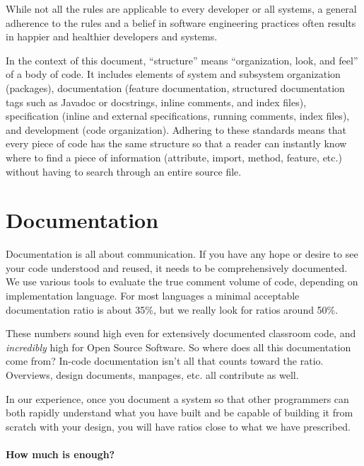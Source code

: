 \documentclass[10pt,letter]{article}
\begin{document}
While not all the rules are applicable to every developer or all systems, a general adherence to the rules and a belief in software engineering practices often results in happier and healthier developers and systems.

In the context of this document, ``structure'' means ``organization, look, and feel'' of a body of code. It includes elements of system and subsystem organization (packages), documentation (feature documentation, structured documentation tags such as Javadoc or docstrings, inline comments, and index files), specification (inline and external specifications, running comments, index files), and development (code organization). Adhering to these standards means that every piece of code has the same structure so that a reader can instantly know where to find a piece of information (attribute, import, method, feature, etc.) without having to search through an entire source file.

\section{Documentation}

Documentation is all about communication. If you have any hope or desire to see your code understood and reused, it needs to be comprehensively documented. We use various tools to evaluate the true comment volume of code, depending on implementation language. For most languages a minimal acceptable documentation ratio is about 35\%, but we really look for ratios around 50\%.

These numbers sound high even for extensively documented classroom code, and \emph{incredibly} high for Open Source Software. So where does all this documentation come from?
In-code documentation isn't all that counts toward the ratio. Overviews, design documents, manpages, etc. all contribute as well.

In our experience, once you document a system so that other programmers can both rapidly understand what you have built and be capable of building it from scratch with your design, you will have ratios close to what we have prescribed.

\paragraph{How much is enough?}
\end{document}
